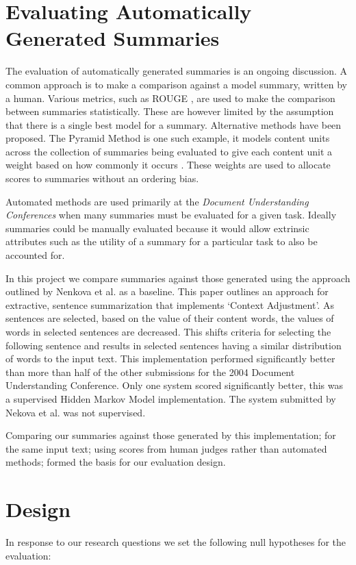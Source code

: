   \section{Evaluating Automatically Generated Summaries}
    The evaluation of automatically generated summaries is an ongoing discussion. A common approach is to make a comparison against a model summary, written by a human. Various metrics, such as ROUGE \cite{lin2004rouge}, are used to make the comparison between summaries statistically. These are however limited by the assumption that there is a single best model for a summary. Alternative methods have been proposed. The Pyramid Method is one such example, it models content units across the collection of summaries being evaluated to give each content unit a weight based on how commonly it occurs \cite{nenkova2004evaluating}. These weights are used to allocate scores to summaries without an ordering bias.

    Automated methods are used primarily at the \textit{Document Understanding Conferences} when many summaries must be evaluated for a given task. Ideally summaries could be manually evaluated because it would allow extrinsic attributes such as the utility of a summary for a particular task to also be accounted for.

    In this project we compare summaries against those generated using the approach outlined by Nenkova et al. \cite{nenkova2006compositional} as a baseline. This paper outlines an approach for extractive, sentence summarization that implements `Context Adjustment'. As sentences are selected, based on the value of their content words, the values of words in selected sentences are decreased. This shifts criteria for selecting the following sentence and results in selected sentences having a similar distribution of words to the input text. This implementation performed significantly better than more than half of the other submissions for the 2004 Document Understanding Conference. Only one system scored significantly better, this was a supervised Hidden Markov Model implementation. The system submitted by Nekova et al. was not supervised.

    Comparing our summaries against those generated by this implementation; for the same input text; using scores from human judges rather than automated methods; formed the basis for our evaluation design.

  \section{Design}
    In response to our research questions we set the following null hypotheses for the evaluation:

